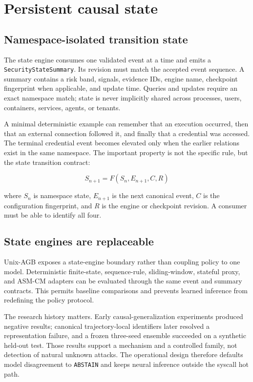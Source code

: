 \documentclass[11pt,a4paper]{article}
\begin{document}
\section{Persistent causal state}

\subsection{Namespace-isolated transition state}

The state engine consumes one validated event at a time and emits a
\texttt{SecurityStateSummary}. Its revision must match the accepted event
sequence. A summary contains a risk band, signals, evidence IDs, engine name,
checkpoint fingerprint when applicable, and update time. Queries and updates
require an exact namespace match; state is never implicitly shared across
processes, users, containers, services, agents, or tenants.

A minimal deterministic example can remember that an execution occurred,
then that an external connection followed it, and finally that a credential was
accessed. The terminal credential event becomes elevated only when the earlier
relations exist in the same namespace. The important property is not the
specific rule, but the state transition contract:

\[
S_{n+1} = F(S_n, E_{n+1}, C, R)
\]

where $S_n$ is namespace state, $E_{n+1}$ is the next canonical event, $C$ is
the configuration fingerprint, and $R$ is the engine or checkpoint revision.
A consumer must be able to identify all four.

\subsection{State engines are replaceable}

Unix-AGB exposes a state-engine boundary rather than coupling policy to one
model. Deterministic finite-state, sequence-rule, sliding-window, stateful
proxy, and ASM-CM adapters can be evaluated through the same event and summary
contracts. This permits baseline comparisons and prevents learned inference
from redefining the policy protocol.

The research history matters. Early causal-generalization experiments produced
negative results; canonical trajectory-local identifiers later resolved a
representation failure, and a frozen three-seed ensemble succeeded on a
synthetic held-out test. Those results support a mechanism and a controlled
family, not detection of natural unknown attacks. The operational design
therefore defaults model disagreement to \texttt{ABSTAIN} and keeps neural
inference outside the syscall hot path.
\end{document}
